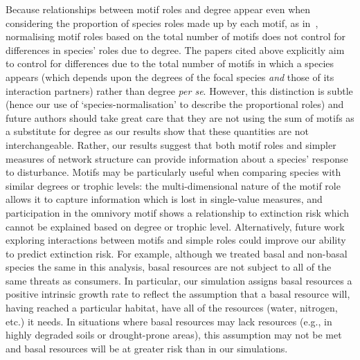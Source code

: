 \documentclass[12pt]{article}
\begin{document}
\begin{spacing}{1.0}
        
	    Because relationships between motif roles and degree appear even when considering the proportion of species roles made up by each motif, as in~\citet{Baker2015,Cirtwill2015,Simmons2019}, normalising motif roles based on the total number of motifs does not control for differences in species' roles due to degree.
	    The papers cited above explicitly aim to control for differences due to the total number of motifs in which a species appears (which depends upon the degrees of the focal species \emph{and} those of its interaction partners) rather than degree \emph{per se}.
	    However, this distinction is subtle (hence our use of `species-normalisation' to describe the proportional roles) and future authors should take great care that they are not using the sum of motifs as a substitute for degree as our results show that these quantities are not interchangeable.
        Rather, our results suggest that both motif roles and simpler measures of network structure can provide information about a species' response to disturbance.
        Motifs may be particularly useful when comparing species with similar degrees or trophic levels: the multi-dimensional nature of the motif role allows it to capture information which is lost in single-value measures, and participation in the omnivory motif shows a relationship to extinction risk which cannot be explained based on degree or trophic level.
        Alternatively, future work exploring interactions between motifs and simple roles could improve our ability to predict extinction risk.
        For example, although we treated basal and non-basal species the same in this analysis, basal resources are not subject to all of the same threats as consumers.
        In particular, our simulation assigns basal resources a positive intrinsic growth rate to reflect the assumption that a basal resource will, having reached a particular habitat, have all of the resources (water, nitrogen, etc.) it needs. 
        In situations where basal resources may lack resources (e.g., in highly degraded soils or drought-prone areas), this assumption may not be met and basal resources will be at greater risk than in our simulations.
        

\end{spacing}
\end{document}
